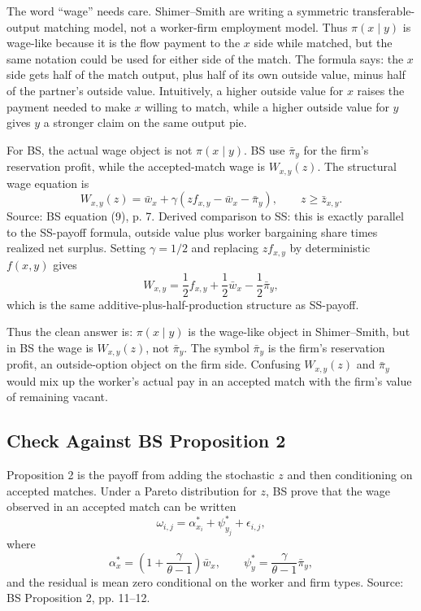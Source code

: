 ﻿\documentclass[11pt]{article}
\newcommand{\1}{\mathbf{1}}
\begin{document}
The word ``wage'' needs care. Shimer--Smith are writing a symmetric
transferable-output matching model, not a worker-firm employment model. Thus
$\pi(x\mid y)$ is wage-like because it is the flow payment to the $x$ side while
matched, but the same notation could be used for either side of the match. The
formula says: the $x$ side gets half of the match output, plus half of its own
outside value, minus half of the partner's outside value. Intuitively, a higher
outside value for $x$ raises the payment needed to make $x$ willing to match,
while a higher outside value for $y$ gives $y$ a stronger claim on the same output
pie.

For BS, the actual wage object is not $\pi(x\mid y)$. BS use $\bar\pi_y$ for the
firm's reservation profit, while the accepted-match wage is $W_{x,y}(z)$. The
structural wage equation is
\[
W_{x,y}(z)
=
\bar w_x+\gamma\left(zf_{x,y}-\bar w_x-\bar\pi_y\right),
\qquad z\geq \bar z_{x,y}.
\]
Source: BS equation (9), p. 7. Derived comparison to SS: this is exactly parallel to the SS-payoff formula,
outside value plus worker bargaining share times realized net surplus. Setting
$\gamma=1/2$ and replacing $z f_{x,y}$ by deterministic $f(x,y)$ gives
\[
W_{x,y}
=
\frac12 f_{x,y}+\frac12\bar w_x-\frac12\bar\pi_y,
\]
which is the same additive-plus-half-production structure as SS-payoff.

Thus the clean answer is: $\pi(x\mid y)$ is the wage-like object in
Shimer--Smith, but in BS the wage is $W_{x,y}(z)$, not $\bar\pi_y$. The symbol
$\bar\pi_y$ is the firm's reservation profit, an outside-option object on the
firm side. Confusing $W_{x,y}(z)$ and $\bar\pi_y$ would mix up the worker's actual
pay in an accepted match with the firm's value of remaining vacant.

\subsection{Check Against BS Proposition 2}

Proposition 2 is the payoff from adding the stochastic $z$ and then conditioning
on accepted matches. Under a Pareto distribution for $z$, BS prove that the wage
observed in an accepted match can be written
\[
\omega_{i,j}
=
\alpha^*_{x_i}+\psi^*_{y_j}+\epsilon_{i,j},
\]
where
\[
\alpha^*_x
=
\left(1+\frac{\gamma}{\theta-1}\right)\bar w_x,
\qquad
\psi^*_y
=
\frac{\gamma}{\theta-1}\bar\pi_y,
\]
and the residual is mean zero conditional on the worker and firm types. Source:
BS Proposition 2, pp. 11--12.
\end{document}
